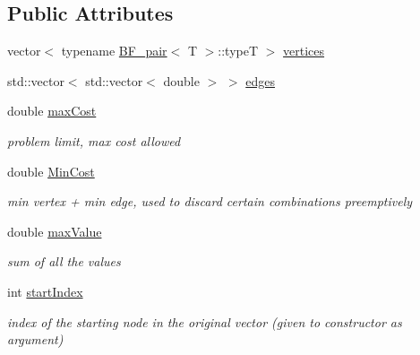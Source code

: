 \subsection*{Public Attributes}
\begin{DoxyCompactItemize}
\item 
vector$<$ typename \hyperlink{struct_b_f__pair}{B\+F\+\_\+pair}$<$ T $>$\+::type\+T $>$ \hyperlink{class_brute_force_a0396c2f7b943c2894ce9fe8c11737030}{vertices}
\item 
std\+::vector$<$ std\+::vector$<$ double $>$ $>$ \hyperlink{class_brute_force_a183a96de9d3c8541e387bea53cffa8ed}{edges}
\item 
\hypertarget{class_brute_force_ae66347aacfd3475ef265f17b0df1df4d}{}double \hyperlink{class_brute_force_ae66347aacfd3475ef265f17b0df1df4d}{max\+Cost}\label{class_brute_force_ae66347aacfd3475ef265f17b0df1df4d}

\begin{DoxyCompactList}\small\item\em problem limit, max cost allowed \end{DoxyCompactList}\item 
\hypertarget{class_brute_force_a596f112b7f9a9a0fee829003fa8666ba}{}double \hyperlink{class_brute_force_a596f112b7f9a9a0fee829003fa8666ba}{Min\+Cost}\label{class_brute_force_a596f112b7f9a9a0fee829003fa8666ba}

\begin{DoxyCompactList}\small\item\em min vertex + min edge, used to discard certain combinations preemptively \end{DoxyCompactList}\item 
\hypertarget{class_brute_force_a8f6988c4fdf200f57192024f7016d04d}{}double \hyperlink{class_brute_force_a8f6988c4fdf200f57192024f7016d04d}{max\+Value}\label{class_brute_force_a8f6988c4fdf200f57192024f7016d04d}

\begin{DoxyCompactList}\small\item\em sum of all the values \end{DoxyCompactList}\item 
\hypertarget{class_brute_force_a11c645961c0bf974d5da32dfbc0c07e0}{}int \hyperlink{class_brute_force_a11c645961c0bf974d5da32dfbc0c07e0}{start\+Index}\label{class_brute_force_a11c645961c0bf974d5da32dfbc0c07e0}

\begin{DoxyCompactList}\small\item\em index of the starting node in the original vector (given to constructor as argument) \end{DoxyCompactList}\end{DoxyCompactItemize}


